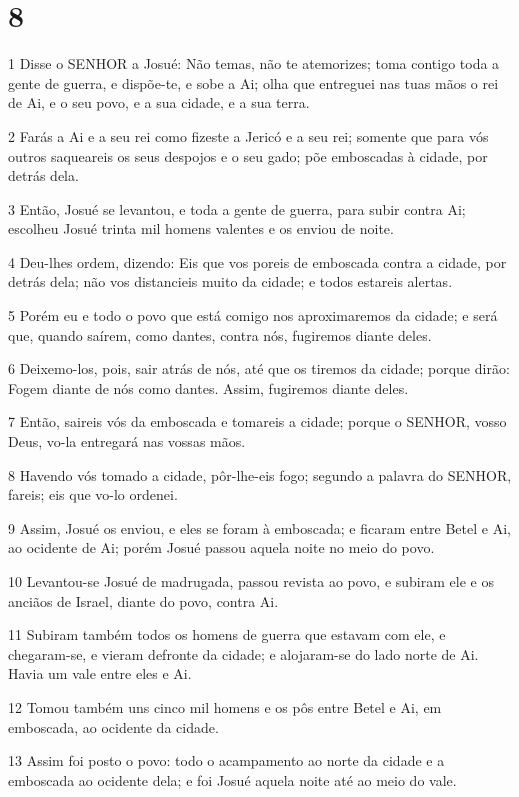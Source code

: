 \chapter{8}

\par 1 Disse o SENHOR a Josué: Não temas, não te atemorizes; toma contigo toda a gente de guerra, e dispõe-te, e sobe a Ai; olha que entreguei nas tuas mãos o rei de Ai, e o seu povo, e a sua cidade, e a sua terra.
\par 2 Farás a Ai e a seu rei como fizeste a Jericó e a seu rei; somente que para vós outros saqueareis os seus despojos e o seu gado; põe emboscadas à cidade, por detrás dela.
\par 3 Então, Josué se levantou, e toda a gente de guerra, para subir contra Ai; escolheu Josué trinta mil homens valentes e os enviou de noite.
\par 4 Deu-lhes ordem, dizendo: Eis que vos poreis de emboscada contra a cidade, por detrás dela; não vos distancieis muito da cidade; e todos estareis alertas.
\par 5 Porém eu e todo o povo que está comigo nos aproximaremos da cidade; e será que, quando saírem, como dantes, contra nós, fugiremos diante deles.
\par 6 Deixemo-los, pois, sair atrás de nós, até que os tiremos da cidade; porque dirão: Fogem diante de nós como dantes. Assim, fugiremos diante deles.
\par 7 Então, saireis vós da emboscada e tomareis a cidade; porque o SENHOR, vosso Deus, vo-la entregará nas vossas mãos.
\par 8 Havendo vós tomado a cidade, pôr-lhe-eis fogo; segundo a palavra do SENHOR, fareis; eis que vo-lo ordenei.
\par 9 Assim, Josué os enviou, e eles se foram à emboscada; e ficaram entre Betel e Ai, ao ocidente de Ai; porém Josué passou aquela noite no meio do povo.
\par 10 Levantou-se Josué de madrugada, passou revista ao povo, e subiram ele e os anciãos de Israel, diante do povo, contra Ai.
\par 11 Subiram também todos os homens de guerra que estavam com ele, e chegaram-se, e vieram defronte da cidade; e alojaram-se do lado norte de Ai. Havia um vale entre eles e Ai.
\par 12 Tomou também uns cinco mil homens e os pôs entre Betel e Ai, em emboscada, ao ocidente da cidade.
\par 13 Assim foi posto o povo: todo o acampamento ao norte da cidade e a emboscada ao ocidente dela; e foi Josué aquela noite até ao meio do vale.
